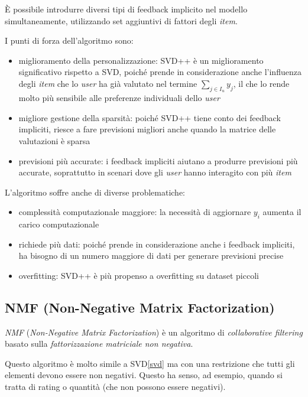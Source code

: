 È possibile introdurre diversi tipi di feedback implicito nel modello simultaneamente, utilizzando set aggiuntivi di fattori degli \textit{item}.

I punti di forza dell'algoritmo sono:

\begin{itemize}
    \item miglioramento della personalizzazione: SVD++ è un miglioramento significativo rispetto a SVD, poiché prende in considerazione anche l'influenza degli \textit{item} che lo \textit{user} ha già valutato nel termine $\sum\limits_{j \in I_u} y_j$, il che lo rende molto più sensibile alle preferenze individuali dello \textit{user}
    \item migliore gestione della sparsità: poiché SVD++ tiene conto dei feedback impliciti, riesce a fare previsioni migliori anche quando la matrice delle valutazioni è sparsa
    \item previsioni più accurate: i feedback impliciti aiutano a produrre previsioni più accurate, soprattutto in scenari dove gli \textit{user} hanno interagito con più \textit{item}
\end{itemize}

L'algoritmo soffre anche di diverse problematiche:

\begin{itemize}
    \item complessità computazionale maggiore: la necessità di aggiornare $y_i$ aumenta il carico computazionale
    \item richiede più dati: poiché prende in considerazione anche i feedback impliciti, ha bisogno di un numero maggiore di dati per generare previsioni precise
    \item overfitting: SVD++ è più propenso a overfitting su dataset piccoli
\end{itemize}

\subsection{NMF (Non-Negative Matrix Factorization)}\label{nmf}

\textit{NMF} (\textit{Non-Negative Matrix Factorization}) è un algoritmo di \textit{collaborative filtering} basato sulla \textit{fattorizzazione matriciale non negativa}.  

Questo algoritmo è molto simile a SVD\ref{svd} ma con una restrizione che tutti gli elementi devono essere non negativi. Questo ha senso, ad esempio, quando si tratta di rating o quantità (che non possono essere negativi).

